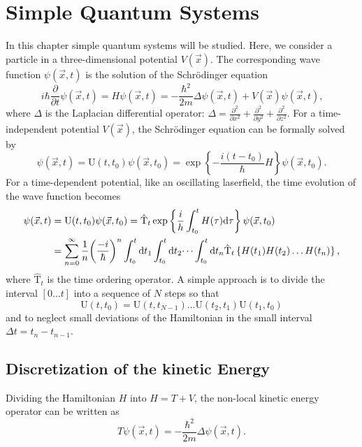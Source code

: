\documentclass[twoside,        %
			   11pt,			%
               BCOR10mm,       %
               ngerman,english  %
               ]{scrartcl}
\begin{document}
\section{Simple Quantum Systems}\label{1}
In this chapter simple quantum systems will be studied. Here, we consider a particle in a three-dimensional potential $V(\vec{x})$. The corresponding wave function $\psi(\vec{x}, t)$ is the solution of the Schrödinger equation
\begin{equation}
  i\hbar \frac{\partial}{\partial t} \psi(\vec{x}, t) = H \psi(\vec{x}, t) = - \frac{\hbar^2}{2m}	\Delta \psi(\vec{x}, t)+  V(\vec{x}) \psi(\vec{x}, t) \text{,}
\end{equation}
where $\Delta$ is the Laplacian differential operator: $\Delta = \frac{\partial^2}{\partial x^2} +\frac{\partial^2}{\partial y^2} + \frac{\partial^2}{\partial z^2} $. For a time-independent potential $V(\vec{x})$, the Schrödinger equation can be formally solved by 
\begin{equation}
     \psi(\vec{x}, t) = \text{U}(t, t_0) \psi(\vec{x}, t_0)   = \exp \left\{ - \frac{i(t-t_0) }{\hbar} H \right\}  \psi(\vec{x}, t_0) \text{.}
\end{equation} 
For a time-dependent potential, like an oscillating laserfield, the time evolution of the wave function becomes
\begin{align}
   \psi(\vec{x}, t) &= \text{U}(t, t_0) \psi(\vec{x}, t_0)  = \hat{\text{T}}_t  \exp \left\{ \frac{i}{h} \int_{t_0}^t H(\tau) \mathrm{d} \tau \right \}  \psi(\vec{x}, t_0)  \\
   &=  \sum_{n = 0}^\infty \frac{1}{n} {\left( \frac{- i}{\hbar} \right) }^n \int_{t_0}^t \mathrm{d} t_1\int_{t_0}^t \mathrm{d} t_2 \dots \int_{t_0}^t \mathrm{d} t_n \hat{\text{T}}_t \left\{ H(t_1)H(t_2) \dots H(t_n) \right\} \text{,} \nonumber
\end{align} 
where $\hat{\text{T}}_t$ is the time ordering operator. A simple approach is to divide the interval $[0 \dots t]$ into a sequence of $N$ steps so that
\begin{equation}
   \text{U}(t, t_0) = \text{U}(t, t_{N-1}) \dots \text{U}(t_2, t_1)\text{U}(t_1, t_0)
\end{equation}   and to neglect small deviations of the Hamiltonian in the small interval $\Delta t = t_n - t_{n-1}$.
   
\subsection{Discretization of the kinetic Energy}
Dividing the Hamiltonian $H$ into $H = T + V$, the non-local kinetic energy operator can be written as
\begin{equation}
    T \psi(\vec{x}, t) = - \frac{\hbar^2}{2m} \Delta \psi(\vec{x}, t) \text{.}
\end{equation}
    
\end{document}
